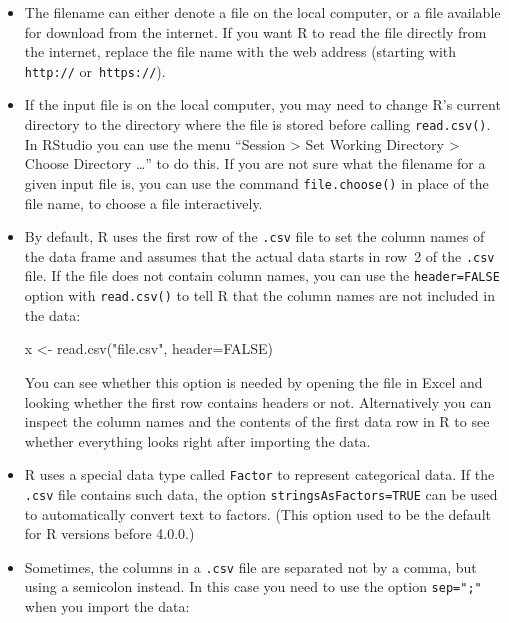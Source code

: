 \documentclass[
  a4paper,
]{article}
\newenvironment{Shaded}{\begin{snugshade}}{\end{snugshade}}
\newcommand{\AttributeTok}[1]{\textcolor[rgb]{0.77,0.63,0.00}{#1}}
\newcommand{\ConstantTok}[1]{\textcolor[rgb]{0.00,0.00,0.00}{#1}}
\newcommand{\FunctionTok}[1]{\textcolor[rgb]{0.00,0.00,0.00}{#1}}
\newcommand{\NormalTok}[1]{#1}
\newcommand{\OtherTok}[1]{\textcolor[rgb]{0.56,0.35,0.01}{#1}}
\newcommand{\StringTok}[1]{\textcolor[rgb]{0.31,0.60,0.02}{#1}}
\theoremstyle{definition}
\theoremstyle{definition}
\theoremstyle{definition}
\theoremstyle{definition}
\theoremstyle{remark}
\begin{document}
\begin{itemize}
\item
  The filename can either denote a file on the local computer, or
  a file available for download from the internet. If you want R to read the
  file directly from the internet, replace the file name with the web address
  (starting with \texttt{http://} or~\texttt{https://}).
\item
  If the input file is on the local computer, you may
  need to change R's current directory to the directory where the file is
  stored before calling \texttt{read.csv()}. In RStudio you can use the menu
  ``Session \textgreater{} Set Working Directory \textgreater{} Choose Directory \ldots{}'' to do this. If you
  are not sure what the filename for a given input file is, you can use the
  command \texttt{file.choose()} in place of the file name, to choose a file
  interactively.
\item
  By default, R uses the first row of the \texttt{.csv} file to set
  the column names of the data frame and assumes that the actual data
  starts in row~2 of the \texttt{.csv} file. If the file does not
  contain column names, you can use the \texttt{header=FALSE} option
  with \texttt{read.csv()} to tell R that the column names are not
  included in the data:

\begin{Shaded}
\begin{Highlighting}[]
\NormalTok{  x }\OtherTok{\textless{}{-}} \FunctionTok{read.csv}\NormalTok{(}\StringTok{"file.csv"}\NormalTok{, }\AttributeTok{header=}\ConstantTok{FALSE}\NormalTok{)}
\end{Highlighting}
\end{Shaded}

  You can see whether this option is needed by opening the file in
  Excel and looking whether the first row contains headers or not.
  Alternatively you can inspect the column names and the contents of
  the first data row in R to see whether everything looks right after
  importing the data.
\item
  R uses a special data type called \texttt{Factor} to represent categorical
  data. If the \texttt{.csv} file contains such data, the option
  \texttt{stringsAsFactors=TRUE} can be used to automatically convert
  text to factors. (This option used to be the default for R versions
  before 4.0.0.)
\item
  Sometimes, the columns in a \texttt{.csv} file are separated not
  by a comma, but using a semicolon instead. In this case you
  need to use the option \texttt{sep=";"} when you import the data:


\end{itemize}
\end{document}

